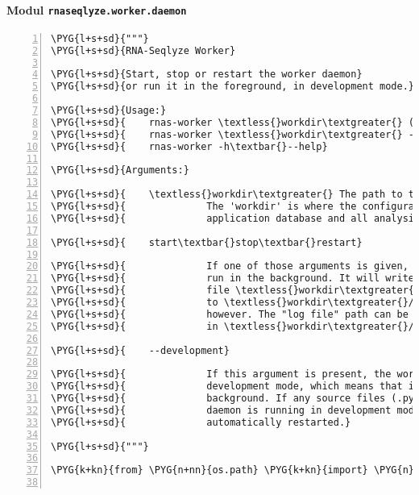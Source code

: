 \paragraph{Modul \texttt{rnaseqlyze.worker.daemon}}
\label{rnaseqlyze-pdf:modul-rnaseqlyze-worker-daemon}
\begin{Verbatim}[commandchars=\\\{\},numbers=left,firstnumber=1,stepnumber=5]
\PYG{l+s+sd}{"""}
\PYG{l+s+sd}{RNA-Seqlyze Worker}

\PYG{l+s+sd}{Start, stop or restart the worker daemon}
\PYG{l+s+sd}{or run it in the foreground, in development mode.}

\PYG{l+s+sd}{Usage:}
\PYG{l+s+sd}{    rnas-worker \textless{}workdir\textgreater{} (start\textbar{}stop\textbar{}restart)}
\PYG{l+s+sd}{    rnas-worker \textless{}workdir\textgreater{} --development}
\PYG{l+s+sd}{    rnas-worker -h\textbar{}--help}

\PYG{l+s+sd}{Arguments:}

\PYG{l+s+sd}{    \textless{}workdir\textgreater{} The path to the workers 'workdir'.}
\PYG{l+s+sd}{              The 'workdir' is where the configuration, the}
\PYG{l+s+sd}{              application database and all analysis data are stored.}

\PYG{l+s+sd}{    start\textbar{}stop\textbar{}restart}

\PYG{l+s+sd}{              If one of those arguments is given, the daemon is}
\PYG{l+s+sd}{              run in the background. It will write it's PID to the}
\PYG{l+s+sd}{              file \textless{}workdir\textgreater{}/worker-daemon.pid and its output will be logged}
\PYG{l+s+sd}{              to \textless{}workdir\textgreater{}/worker-daemon.log. This is not the "log file"}
\PYG{l+s+sd}{              however. The "log file" path can be configured}
\PYG{l+s+sd}{              in \textless{}workdir\textgreater{}/worker.ini.}

\PYG{l+s+sd}{    --development}

\PYG{l+s+sd}{              If this argument is present, the worker daemon is run in}
\PYG{l+s+sd}{              development mode, which means that it will no fork to the}
\PYG{l+s+sd}{              background. If any source files (.py) are changed when the}
\PYG{l+s+sd}{              daemon is running in development mode, it will be}
\PYG{l+s+sd}{              automatically restarted.}

\PYG{l+s+sd}{"""}

\PYG{k+kn}{from} \PYG{n+nn}{os.path} \PYG{k+kn}{import} \PYG{n}{abspath}\PYG{p}{,} \PYG{n}{join}


\end{Verbatim}
